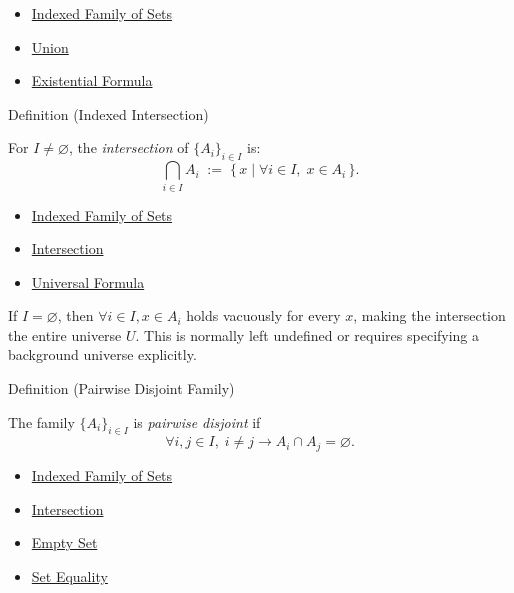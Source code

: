 \begin{dependencies}
\begin{itemize}
  \item \hyperref[def:indexed-family]{Indexed Family of Sets}
  \item \hyperref[def:union]{Union}
  \item \hyperref[def:existential-q]{Existential Formula}
\end{itemize}
\end{dependencies}

\begin{definitionbox}{Definition (Indexed Intersection)}
\begin{definition}\label{def:indexed-intersection}
For $I \neq \varnothing$, the \emph{intersection} of $\{A_i\}_{i \in I}$ is:
\[
\bigcap_{i \in I} A_i
\;:=\;
\{\, x \mid \forall i \in I,\; x \in A_i \,\}.
\]
\end{definition}
\end{definitionbox}

\begin{dependencies}
\begin{itemize}
  \item \hyperref[def:indexed-family]{Indexed Family of Sets}
  \item \hyperref[def:intersection]{Intersection}
  \item \hyperref[def:universal-q]{Universal Formula}
\end{itemize}
\end{dependencies}

\begin{remark*}
If $I = \varnothing$, then $\forall i \in I, x \in A_i$ holds vacuously for
every $x$, making the intersection the entire universe $U$. This is normally
left undefined or requires specifying a background universe explicitly.
\end{remark*}

\begin{definitionbox}{Definition (Pairwise Disjoint Family)}
\begin{definition}\label{def:pairwise-disjoint}
The family $\{A_i\}_{i \in I}$ is \emph{pairwise disjoint} if
\[
\forall i,j \in I,\;
i \neq j \rightarrow A_i \cap A_j = \varnothing.
\]
\end{definition}
\end{definitionbox}

\begin{dependencies}
\begin{itemize}
  \item \hyperref[def:indexed-family]{Indexed Family of Sets}
  \item \hyperref[def:intersection]{Intersection}
  \item \hyperref[def:empty-set]{Empty Set}
  \item \hyperref[def:set-equality]{Set Equality}
\end{itemize}
\end{dependencies}


